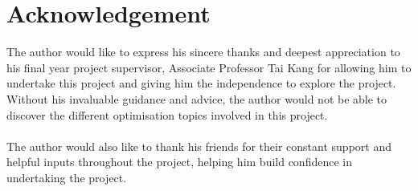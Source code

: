 \chapter*{Acknowledgement}

The author would like to express his sincere thanks and deepest appreciation to his final 
year project supervisor, Associate Professor Tai Kang for allowing him to undertake this project and giving him the independence to explore the project.  Without his invaluable guidance and advice, the author would not be able to discover the different optimisation topics involved in this project. \\
\\
The author would also like to thank his friends for their constant support and helpful inputs throughout the project, helping him build confidence in undertaking the project.
